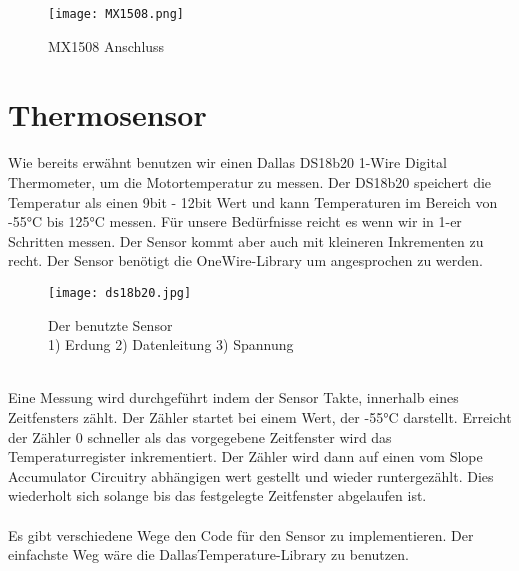 \documentclass[12pt]{article}
\begin{document}
\newpage
\begin{figure}[h]
	\texttt{[image: MX1508.png]}
	\centering
	\caption{MX1508 Anschluss \cite{MX1508}}
\end{figure} 


\newpage
\section{Thermosensor} %
Wie bereits erwähnt benutzen wir einen Dallas DS18b20  1-Wire Digital Thermometer, um die Motortemperatur zu messen. Der DS18b20 speichert die Temperatur als einen 9bit - 12bit Wert und kann Temperaturen im Bereich von -55°C bis 125°C messen. Für unsere Bedürfnisse reicht es wenn wir in 1-er Schritten messen. Der Sensor kommt aber auch mit kleineren Inkrementen zu recht. Der Sensor benötigt die OneWire-Library um angesprochen zu werden.\\
\begin{figure}[h]
	\texttt{[image: ds18b20.jpg]}
	\centering
	\caption{Der benutzte Sensor \\1) Erdung 2) Datenleitung 3) Spannung}
\end{figure}
\\
Eine Messung wird durchgeführt indem der Sensor Takte, innerhalb eines Zeitfensters zählt. Der Zähler startet bei einem Wert, der -55°C darstellt. Erreicht der Zähler 0 schneller als das vorgegebene Zeitfenster wird das Temperaturregister inkrementiert. Der Zähler wird dann auf einen vom Slope Accumulator Circuitry abhängigen wert gestellt und wieder runtergezählt. Dies wiederholt sich solange bis das festgelegte Zeitfenster abgelaufen ist. \\
\\
Es gibt verschiedene Wege den Code für den Sensor zu implementieren. Der einfachste Weg wäre die DallasTemperature-Library zu benutzen.
\end{document}

